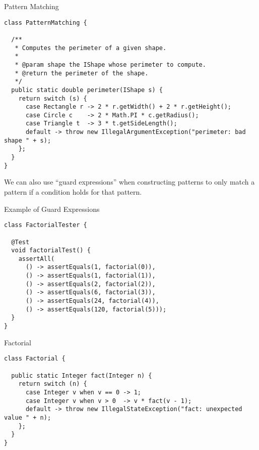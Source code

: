 \begin{cl}[]{Pattern Matching}
\begin{lstlisting}[language=MyJava]
class PatternMatching {

  /**
   * Computes the perimeter of a given shape.
   * 
   * @param shape the IShape whose perimeter to compute.
   * @return the perimeter of the shape.
   */
  public static double perimeter(IShape s) {
    return switch (s) {
      case Rectangle r -> 2 * r.getWidth() + 2 * r.getHeight();
      case Circle c    -> 2 * Math.PI * c.getRadius();
      case Triangle t  -> 3 * t.getSideLength();
      default -> throw new IllegalArgumentException("perimeter: bad shape " + s);
    };
  }
}
\end{lstlisting}
\end{cl}

We can also use ``guard expressions'' when constructing patterns to only match a pattern if a condition holds for that pattern.


\begin{cl}[]{Example of Guard Expressions} 
\begin{lstlisting}[language=MyJava]
class FactorialTester {

  @Test
  void factorialTest() {
    assertAll(
      () -> assertEquals(1, factorial(0)),
      () -> assertEquals(1, factorial(1)),
      () -> assertEquals(2, factorial(2)),
      () -> assertEquals(6, factorial(3)),
      () -> assertEquals(24, factorial(4)),
      () -> assertEquals(120, factorial(5)));
  }
}
\end{lstlisting}
\end{cl}

\begin{cl}[]{Factorial}
\begin{lstlisting}[language=MyJava]
class Factorial {

  public static Integer fact(Integer n) {
    return switch (n) {
      case Integer v when v == 0 -> 1;
      case Integer v when v > 0  -> v * fact(v - 1);
      default -> throw new IllegalStateException("fact: unexpected value " + n);
    };
  }
}
\end{lstlisting}
\end{cl}

